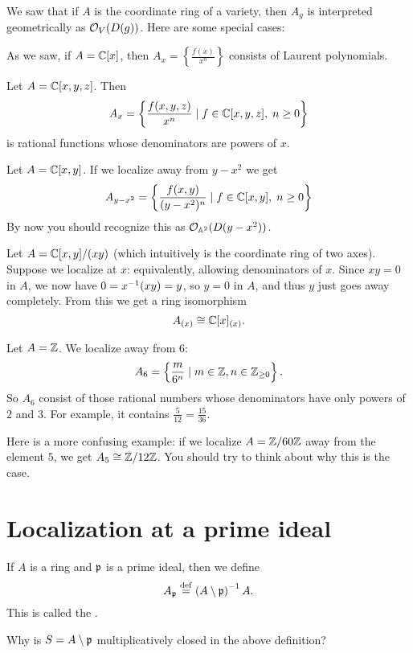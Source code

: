 \begin{example}
	We saw that if $A$ is the coordinate ring of a variety,
	then $A_g$ is interpreted geometrically as $\mathcal O_V(D(g))$.
	Here are some special cases:
	\begin{enumerate}[(a)]
		\ii As we saw, if $A = \mathbb C[x]$,
		then $A_{x} = \left\{ \frac{f(x)}{x^n} \right\}$
		consists of Laurent polynomials.

		\ii Let $A = \mathbb C[x,y,z]$.
		Then \[ A_x = \left\{ \frac{f(x,y,z)}{x^n} \mid
			f \in \mathbb C[x,y,z], \; n \ge 0 \right\} \]
		is rational functions whose denominators are powers of $x$.

		\ii Let $A = \mathbb C[x,y]$.
		If we localize away from $y-x^2$ we get
		\[ A_{y-x^2} = \left\{ \frac{f(x,y)}{(y-x^2)^n} \mid
			f \in \mathbb C[x,y], \; n \ge 0 \right\} \]
		By now you should recognize this as $\mathcal O_{\mathbb A^2}(D(y-x^2))$.
	\end{enumerate}
\end{example}

\begin{example}
	Let $A = \mathbb C[x,y] / (xy)$
	(which intuitively is the coordinate ring of two axes).
	Suppose we localize at $x$:
	equivalently, allowing denominators of $x$.
	Since $xy = 0$ in $A$, we now have $0 = x^{-1} (xy) = y$,
	so $y = 0$ in $A$, and thus $y$ just goes away completely.
	From this we get a ring isomorphism
	\[ A_{(x)} \cong \mathbb C[x]_{(x)}. \]
\end{example}

\begin{example}
	\listhack
	\begin{enumerate}[(a)]
		\ii Let $A = \mathbb Z$. We localize away from $6$:
		\[ A_{6} = \left\{ \frac{m}{6^n} \mid m \in \mathbb Z,
			n \in \mathbb Z_{\ge 0} \right\}.  \]
		So $A_6$ consist of those rational numbers whose
		denominators have only powers of $2$ and $3$.
		For example, it contains $\frac{5}{12} = \frac{15}{36}$.

		\ii Here is a more confusing example:
		if we localize $A = \mathbb Z/60\mathbb Z$ away from the element $5$,
		we get $A_5 \cong \mathbb Z/12\mathbb Z$.
		You should try to think about why this is the case.
	\end{enumerate}
\end{example}

\section{Localization at a prime ideal}
\label{sec:localize_prime_ideal}
\begin{definition}
	If $A$ is a ring and $\mathfrak p$ is a prime ideal, then we define
	\[ A_\mathfrak p \overset{\mathrm{def}}{=} \left( A \setminus \mathfrak p \right)^{-1} A. \]
	This is called the .
\end{definition}
\begin{ques}
	Why is $S = A \setminus \mathfrak p$ multiplicatively closed
	in the above definition?
\end{ques}

